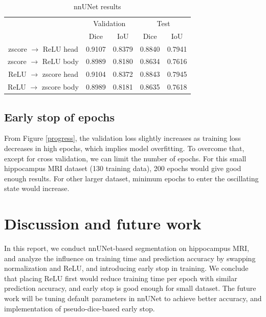 \documentclass{article}
\begin{document}
\begin{table}
  \caption{nnUNet results}
  \label{results}
  \centering
  \begin{tabular}{ccccc}
    \toprule
    & \multicolumn{2}{c}{Validation} & \multicolumn{2}{c}{Test} \\
    \cmidrule(r){2-5}
    & Dice & IoU & Dice & IoU \\
    \midrule
    zscore \(\rightarrow\) ReLU head &0.9107&0.8379&0.8840&0.7941\\
    \cmidrule(r){1-1}
    zscore \(\rightarrow\) ReLU body &0.8989&0.8180&0.8634&0.7616\\
    \cmidrule(r){1-1}
    ReLU \(\rightarrow\) zscore head &0.9104&0.8372&0.8843&0.7945\\
    \cmidrule(r){1-1}
    ReLU \(\rightarrow\) zscore body &0.8989&0.8181&0.8635&0.7618\\
    \bottomrule
  \end{tabular}
\end{table}

\subsection{Early stop of epochs}

From Figure \ref{progress}, the validation loss slightly increases as training loss decreases in high epochs, which implies model overfitting. To overcome that, except for cross validation, we can limit the number of epochs. For this small hippocampus MRI dataset (130 training data), 200 epochs would give good enough results. For other larger dataset, minimum epochs to enter the oscillating state would increase.

\section{Discussion and future work}

In this report, we conduct nnUNet-based segmentation on hippocampus MRI, and analyze the influence on training time and prediction accuracy by swapping normalization and ReLU, and introducing early stop in training. We conclude that placing ReLU first would reduce training time per epoch with similar prediction accuracy, and early stop is good enough for small dataset. The future work will be tuning default parameters in nnUNet to achieve better accuracy, and implementation of pseudo-dice-based early stop.



\end{document}

